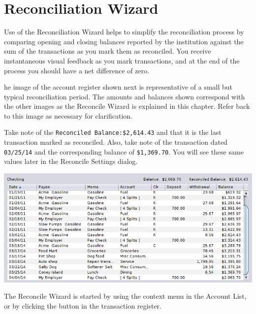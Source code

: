 \documentclass[letterpaper,12pt]{book}
\begin{document}
    \section{Reconciliation Wizard}
    Use of the Reconciliation Wizard helps to simplify the reconciliation process by comparing opening and closing balances
    reported by the institution against the sum of the transactions as you mark them as reconciled. You receive
    instantaneous visual feedback as you mark transactions, and at the end of the process you should have a net difference
    of zero.


    he image of the account register shown next is representative of a small but typical reconciliation period.
    The amounts and balances shown correspond with the other images as the Reconcile Wizard is explained in this chapter.
    Refer back to this image as necessary for clarification.

    Take note of the \texttt{Reconciled Balance:\$2,614.43} and that it is the last transaction marked as reconciled.
    Also, take note of the transaction dated \texttt{03/25/14} and the corresponding balance of \texttt{\$1,369.70}.
    You will see these same values later in the Reconcile Settings dialog.

    \includegraphics[width=1.0\linewidth]{images/reconcile-register}

    The Reconcile Wizard is started by using the context menu in the Account List, or by clicking the 
    button in the transaction register.
\end{document}
